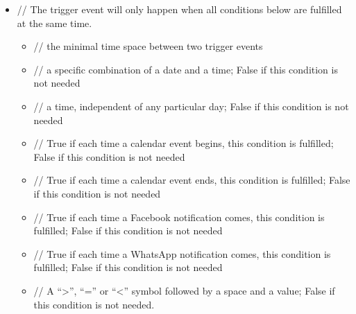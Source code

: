 \documentclass[a4paper]{scrreprt}
\begin{document}
\begin{itemize}
                    \item {}
                        \par // The trigger event will only happen when all conditions below are fulfilled at the same time.
                        \begin{itemize}
                            \item {}
                                \par // the minimal time space between two trigger events
                            \item {}
                                \par // a specific combination of a date and a time; False if this condition is not needed
                            \item {}
                                \par // a time, independent of any particular day; False if this condition is not needed
                            \item {}
                                \par // True if each time a calendar event begins, this condition is fulfilled; False if this condition is not needed
                            \item {}
                                \par // True if each time a calendar event ends, this condition is fulfilled; False if this condition is not needed
                            \item {}
                                \par // True if each time a Facebook notification comes, this condition is fulfilled; False if this condition is not needed
                            \item {}
                                \par // True if each time a WhatsApp notification comes, this condition is fulfilled; False if this condition is not needed
                            \item {}
                                \par // A “>”, “=” or “<” symbol followed by a space and a value; False if this condition is not needed.

\end{itemize}
\end{itemize}
\end{document}
